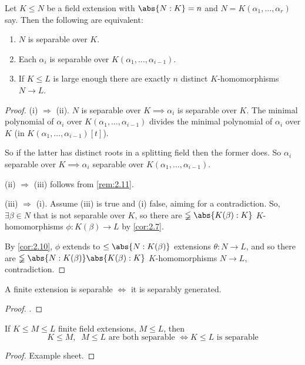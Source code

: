 \documentclass{article}
\begin{document}
\begin{nlemma}\label{lem:2.12}
    Let $K \leq N$ be a field extension with $\abs{N:K} = n$ and $N = K(\alpha_1, \dotsc, \alpha_r)$ say.
    Then the following are equivalent:
    \begin{enumerate}[label=(\roman*)]
        \item $N$ is separable over $K$.
        \item Each $\alpha_i$ is separable over $K(\alpha_1, \dotsc, \alpha_{i-1})$.
        \item If $K \leq L$ is large enough there are exactly $n$ distinct $K$-homomorphisms $N \to L$.
    \end{enumerate}
\end{nlemma}
\begin{proof}
    (i) $\Rightarrow$ (ii).
    $N$ is separable over $K \implies \alpha_i$ is separable over $K$.
    The minimal polynomial of $\alpha_i$ over $K(\alpha_1, \dotsc, \alpha_{i-1})$ divides the minimal polynomial of $\alpha_i$ over $K$ (in $K(\alpha_1, \dotsc, \alpha_{i-1})[t]$).

    So if the latter has distinct roots in a splitting field then the former does.
    So $\alpha_i$ separable over $K \implies \alpha_i$ separable over $K(\alpha_1, \dotsc, \alpha_{i-1})$.

    (ii) $\Rightarrow$ (iii) follows from \cref{rem:2.11}.

    (iii) $\Rightarrow$ (i). Assume (iii) is true and (i) false, aiming for a contradiction.
    So, $\exists \beta \in N$ that is not separable over $K$, so there are $\lneqq\abs{K(\beta):K}$ $K$-homomorphisms $\phi:K(\beta) \to L$ by \cref{cor:2.7}.

    By \cref{cor:2.10}, $\phi$ extends to $\leq \abs{N:K(\beta)}$ extensions $\theta: N \to L$, and so there are $\lneqq\abs{N:K(\beta)}\abs{K(\beta):K}$ $K$-homomorphisms $N\to L$, contradiction.
\end{proof}

\begin{ncor}\label{cor:2.14}
    A finite extension is separable $\iff$ it is separably generated.
\end{ncor}
\begin{proof}
    .
\end{proof}
\begin{nlemma}\label{lem:2.15}
    If $K \leq M \leq L$ finite field extensions, $M \leq L$, then
    \begin{equation*}
        K \leq M, \; \; M \leq L \text{ are both separable } \iff K \leq L \text{ is separable}
    \end{equation*}
\end{nlemma}
\begin{proof}
    Example sheet.
\end{proof}
\end{document}
